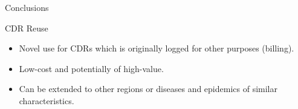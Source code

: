 \documentclass{beamer}
\begin{document}
	
\begin{frame}{Conclusions}
	\begin{block}{CDR Reuse}
		\begin{itemize}
			\item Novel use for CDRs which is originally logged for other purposes (billing).
			\item Low-cost and potentially of high-value.
			\item Can be extended to other regions or diseases and epidemics of similar characteristics.
		\end{itemize}
		
		
	\end{block}
\end{frame}


%
%			
%  	 		
  
  
\end{document}
